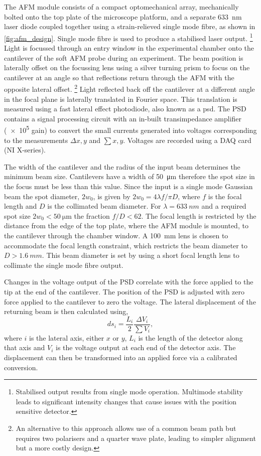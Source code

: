 \documentclass{article}
\begin{document}
The AFM module consists of a compact optomechanical {\color{red}array}, mechanically bolted onto the top plate of the microscope platform, and a separate \SI{633}{nm} laser diode coupled together using a strain-relieved single mode fibre, as shown in \autoref{fig:afm_design}. Single mode fibre is used to produce a stabilised laser output.%
\footnote{Stabilised output results from single mode operation. Multimode stability leads to significant intensity changes that cause issues with the position sensitive detector.}
Light is focussed through an entry window in the experimental chamber onto the cantilever of the soft AFM probe during an experiment. The beam position is laterally offset on the focussing lens using a silver turning prism to focus on the cantilever at an angle so that reflections return through the AFM with the opposite lateral offset.%
\footnote{An alternative to this approach allows use of a common beam path but requires two polarisers and a quarter wave plate, leading to simpler alignment but a more costly design.}
Light reflected back off the cantilever at a different angle in the focal plane is laterally translated in Fourier space. This translation is measured using a fast lateral effect photodiode, also known as a \gls{psd}. The PSD contains a signal processing circuit with an in-built transimpedance amplifier (\num{e5} gain) to convert the small currents generated into voltages corresponding to the measurements $\Delta x,y$ and $\sum x,y$. Voltages are recorded using a DAQ card (NI X-series).

The width of the cantilever and the radius of the input beam determines the minimum beam size. Cantilevers have a width of \SI{50}{\micro\metre} therefore the spot size in the focus must be less than this value. Since the input is a single mode Gaussian beam the spot diameter, $2w_0$, is given by $2w_0 = 4\lambda f/ \pi D$, where $f$ is the focal length and $D$ is the collimated beam diameter. For $\lambda=\SI{633}{nm}$ and a required spot size $2w_0 < \SI{50}{\micro\metre}$ the fraction $f/D < 62$. The focal length is restricted by the distance from the edge of the top plate, where the AFM module is mounted, to the cantilever through the chamber window. A \SI{100}{mm} lens is chosen to accommodate the focal length constraint, which restricts the beam diameter to $D > \SI{1.6}{mm}$. This beam diameter is set by using a short focal length lens to collimate the single mode fibre output.

Changes in the voltage output of the PSD correlate with the force applied to the tip at the end of the cantilever. The position of the PSD is adjusted with zero force applied to the cantilever to zero the voltage. The lateral displacement of the returning beam is then calculated using,
\begin{equation}
ds_i = \frac{L_i}{2}\frac{\Delta V_i}{\sum V_i},
\end{equation}
where $i$ is the lateral axis, either $x$ or $y$, $L_i$ is the length of the detector along that axis and $V_i$ is the voltage output at each end of the detector axis. The displacement can then be transformed into an applied force via a calibrated conversion.
\end{document}
